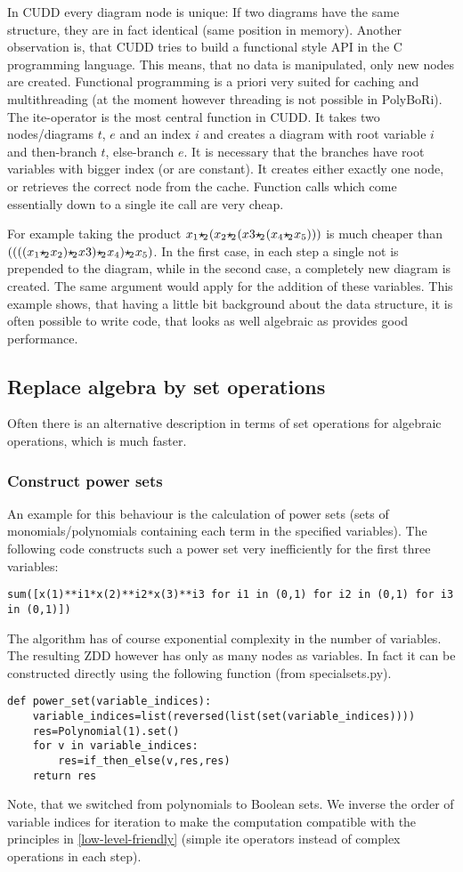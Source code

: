 \documentclass[]{article}
\newcommand{\PolyBoRi}{{\sc PolyBoRi}\xspace}
\newcommand{\CUDD}{{CUDD}\xspace}
\newcommand{\ite}{{ite}\xspace}
\providecommand{\boolemult}{\ensuremath{{\star\hspace{-.15em}_2\hspace{.05em}}}\xspace}
\begin{document}
In \CUDD every diagram node is unique: If two diagrams have the same structure, they are in fact identical (same position in memory).
Another observation is, that \CUDD tries to build a functional style API in the C programming language. This means, that no data is manipulated, only new nodes are created.
Functional programming is a priori very suited for caching and multithreading (at the moment however threading is not possible in \PolyBoRi).
The \ite-operator is the most central function in CUDD. It takes two nodes/diagrams $t$, $e$ and an index $i$ and creates a diagram with root variable $i$ and
then-branch $t$, else-branch $e$. It is necessary that the branches have root variables with bigger index (or are constant).
It creates either exactly one node, or retrieves the correct node from the cache.
Function calls which come essentially down to a single \ite call are very cheap.

For example taking the product $x_1 \boolemult (x_2\boolemult(x3\boolemult (x_4\boolemult x_5)))$ is much cheaper than $((((x_1 \boolemult x_2)\boolemult x3)\boolemult x_4)\boolemult x_5)$.
In the first case, in each step a single not is prepended to the diagram, while in the second case, a completely new diagram is created.
The same argument would apply for the addition of these variables.
This example shows, that having a little bit background about the data structure, it is often possible to write code, that looks as well algebraic as provides good performance.

\subsection{Replace algebra by set operations}
Often there is an alternative description in terms of set operations for algebraic operations, which is much faster.

\subsubsection{Construct power sets}
An example for this behaviour is the calculation of power sets (sets of monomials/polynomials containing each term in the specified variables).
The following code constructs such a power set very inefficiently for the first three variables:
\begin{verbatim}
sum([x(1)**i1*x(2)**i2*x(3)**i3 for i1 in (0,1) for i2 in (0,1) for i3 in (0,1)])
\end{verbatim}
The algorithm has of course exponential complexity in the number of variables.
The resulting ZDD however has only as many nodes as variables.
In fact it can be constructed directly using the following function (from specialsets.py).
\begin{verbatim}
def power_set(variable_indices):
    variable_indices=list(reversed(list(set(variable_indices))))
    res=Polynomial(1).set()
    for v in variable_indices:
        res=if_then_else(v,res,res)
    return res
\end{verbatim}
Note, that we switched from polynomials to Boolean sets. We inverse the order of variable indices for iteration to make the computation compatible with the principles in \ref{low-level-friendly} (simple \ite operators instead of complex operations in each step).
\end{document}
